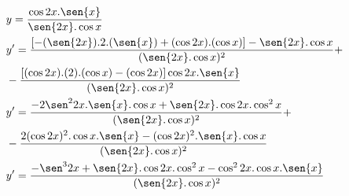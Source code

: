 \begin{ex}
\begin{align}
&y=\frac{\cos{2x}.\sen{x}}{\sen{2x}.\cos{x}}\nonumber\\
&y'=\frac{[-(\sen{2x}).2.(\sen{x})+(\cos{2x}).(\cos{x})]-\sen{2x}.\cos{x}}{(\sen{2x}.\cos{x})^2}+\nonumber\\
&-\frac{[(\cos{2x}).(2).(\cos{x})-(\cos{2x})]\cos{2x}.\sen{x}}{(\sen{2x}.\cos{x})^2}\nonumber\\
&y'=\frac{-2\sen^2{2x}.\sen{x}.\cos{x}+\sen{2x}.\cos{2x}.\cos^2{x}}{(\sen{2x}.\cos{x})^2}+\nonumber\\
&-\frac{2(\cos{2x})^2.\cos{x}.\sen{x}-(\cos{2x})^2.\sen{x}.\cos{x}}{(\sen{2x}.\cos{x})^2}\nonumber\\
&y'=\frac{-\sen^3{2x}+\sen{2x}.\cos{2x}.\cos^2{x}-\cos^2{2x}.\cos{x}.\sen{x}}{(\sen{2x}.\cos{x})^2}\nonumber
\end{align}
\end{ex}